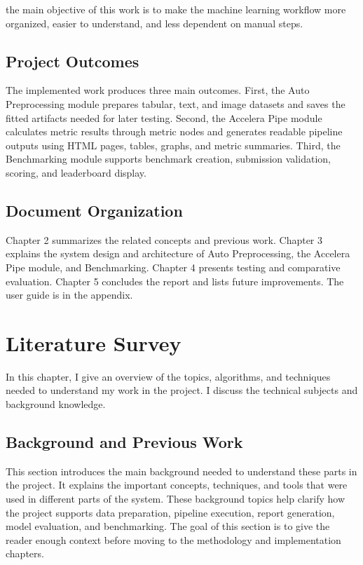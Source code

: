 \documentclass[12pt,a4paper,oneside]{report}
\begin{document}
\noindent the main objective of this work is to make the machine learning workflow more organized, easier to understand, and less dependent on manual steps.\\


\section{Project Outcomes}
The implemented work produces three main outcomes. First, the Auto Preprocessing module prepares tabular, text, and image datasets and saves the fitted artifacts needed for later testing. Second, the Accelera Pipe module calculates metric results through metric nodes and generates readable pipeline outputs using HTML pages, tables, graphs, and metric summaries. Third, the Benchmarking module supports benchmark creation, submission validation, scoring, and leaderboard display.

\section{Document Organization}
Chapter 2 summarizes the related concepts and previous work. Chapter 3 explains the system design and architecture of Auto Preprocessing, the Accelera Pipe module, and Benchmarking. Chapter 4 presents testing and comparative evaluation. Chapter 5 concludes the report and lists future improvements. The user guide is in the appendix.


\chapter{Literature Survey}
In this chapter, I give an overview of the topics, algorithms, and techniques needed to understand my work in the project. I discuss the technical subjects and background knowledge.

\section{Background and Previous Work}
\noindent This section introduces the main background needed to understand these parts in the project. It explains the important concepts, techniques, and tools that were used in different parts of the system. These background topics help clarify how the project supports data preparation, pipeline execution, report generation, model evaluation, and benchmarking. The goal of this section is to give the reader enough context before moving to the methodology and implementation chapters.
\end{document}
